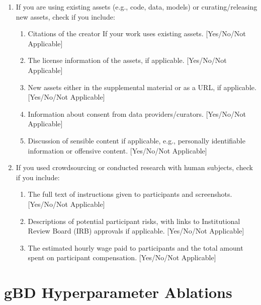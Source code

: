 \documentclass[twoside]{article}
\begin{document}
\begin{enumerate}
  \item If you are using existing assets (e.g., code, data, models) or curating/releasing new assets, check if you include:
  \begin{enumerate}
    \item Citations of the creator If your work uses existing assets. [Yes/No/Not Applicable]
    \item The license information of the assets, if applicable. [Yes/No/Not Applicable]
    \item New assets either in the supplemental material or as a URL, if applicable. [Yes/No/Not Applicable]
    \item Information about consent from data providers/curators. [Yes/No/Not Applicable]
    \item Discussion of sensible content if applicable, e.g., personally identifiable information or offensive content. [Yes/No/Not Applicable]
  \end{enumerate}

  \item If you used crowdsourcing or conducted research with human subjects, check if you include:
  \begin{enumerate}
    \item The full text of instructions given to participants and screenshots. [Yes/No/Not Applicable]
    \item Descriptions of potential participant risks, with links to Institutional Review Board (IRB) approvals if applicable. [Yes/No/Not Applicable]
    \item The estimated hourly wage paid to participants and the total amount spent on participant compensation. [Yes/No/Not Applicable]
  \end{enumerate}

\end{enumerate}

\clearpage
\appendix
\thispagestyle{empty}

\onecolumn
{}

\section{gBD Hyperparameter Ablations}
\label{app:ablation}
\end{document}
